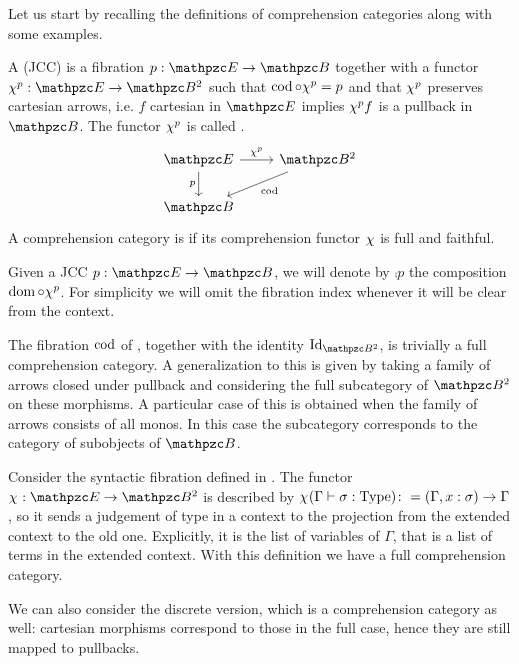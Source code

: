 \documentclass{lmcs} %
\theoremstyle{plain}\newtheorem{satz}[thm]{Satz} %
\begin{document}
Let us start by recalling the definitions of comprehension categories along with some examples. 

			\begin{defi}\label{def:compcat}
				A  (JCC) is a fibration $p:\ct{E}\to\ct{B}$ together with a functor $\jcomp{p}:\ct{E}\to\Arr{\ct{B}}$ such that $\mathop{\mathrm{cod}}\nolimits\circ \chi^{p} = p$ and that $\chi^{p}$ preserves cartesian arrows, i.e. $f$ cartesian in $\ct{E}$ implies $\chi^{p} f$ is a pullback in $\ct{B}$. The functor $\chi^{p}$ is called .
				\[\begin{tikzcd}
					{\ct{E}} & {\Arr{\ct{B}}} \\
					{\ct{B}}
					\arrow["{\jcomp{p}}", from=1-1, to=1-2]
					\arrow["p"', from=1-1, to=2-1]
					\arrow["\cod", from=1-2, to=2-1]
				\end{tikzcd}\]
				A comprehension category is  if its comprehension functor $\chi^{}$ is full and faithful.
			\end{defi}

Given a JCC $p : \ct{E} \to \ct{B}$, 
we will denote by $\comp{p}$ the composition $\mathop{\mathrm{dom}}\nolimits\circ\chi^{p}$. For simplicity we will omit the fibration index whenever it will be clear from the context. 
			
			\begin{exa}\label{ex:cod-gen}
				The fibration $\mathop{\mathrm{cod}}\nolimits$ of , together with the identity $\Id{\Arr{\ct{B}}}$, is trivially a full comprehension category. A generalization to this is given by taking a family of arrows closed under pullback and considering the full subcategory of $\Arr{\ct{B}}$ on these morphisms. A particular case of this is obtained when the family of arrows consists of all monos. In this case the subcategory corresponds to the category of subobjects of $\ct{B}$.
			\end{exa}
			
			\begin{exa}\label{ex:typeth2}
				Consider the syntactic fibration defined in . The functor $\jcomp{}:\ct{E}\to\Arr{\ct{B}}$ is described by $\chi^{}(\Gamma\vdash \sigma :\mathrm{Type})\colon =(\Gamma, x:\sigma)\to \Gamma$, so it sends a judgement of type in a context to the projection from the extended context to the old one. Explicitly, it is the list of variables of $\Gamma$, that is a list of terms in the extended context. With this definition we have a full comprehension category.
				
				
				We can also consider the discrete version, which is a comprehension category as well: cartesian morphisms correspond to those in the full case, hence they are still mapped to pullbacks.
			\end{exa}
			
\end{document}
